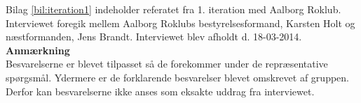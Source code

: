 \label{bil:iteration1}


Bilag \ref{bil:iteration1} indeholder referatet fra 1. iteration med Aalborg Roklub. Interviewet foregik mellem Aalborg Roklubs bestyrelsesformand, Karsten Holt og næstformanden, Jens Brandt. Interviewet blev afholdt d. 18-03-2014.\\

{\bf Anmærkning} \\
Besvarelserne er blevet tilpasset så de forekommer under de repræsentative spørgsmål. Ydermere er de forklarende besvarelser blevet omskrevet af gruppen. Derfor kan besvarelserne ikke anses som eksakte uddrag fra interviewet. 